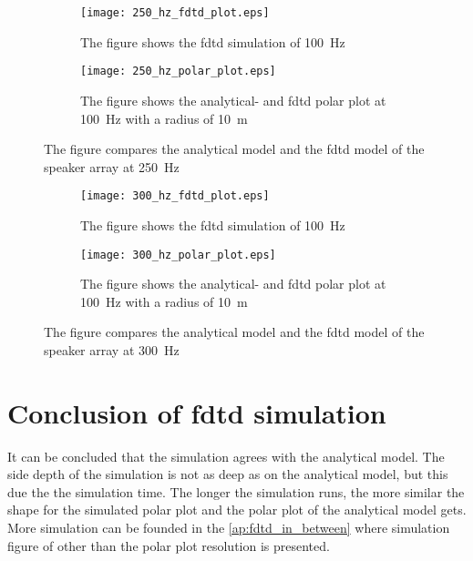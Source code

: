 \begin{figure}[H]
\centering
\begin{subfigure}[htbp]{0.55\textwidth}
		\texttt{[image: 250\_hz\_fdtd\_plot.eps]}
		\caption{The figure shows the \gls{fdtd} simulation of \SI{100}{\hertz}}
		\label{fig:fdtd_250_Hz}
\end{subfigure}
\begin{subfigure}[htbp]{0.35\textwidth}
		\texttt{[image: 250\_hz\_polar\_plot.eps]}
		\caption{The figure shows the analytical- and \gls{fdtd} polar plot at \SI{100}{\hertz} with a radius of \SI{10}{\meter}}
		\label{fig:polar_250_Hz}
\end{subfigure} 
\caption{The figure compares the analytical model and the \gls{fdtd} model of the speaker array at \SI{250}{\hertz}}
\end{figure}


\begin{figure}[H]
\centering
\begin{subfigure}[htbp]{0.55\textwidth}
		\texttt{[image: 300\_hz\_fdtd\_plot.eps]}
		\caption{The figure shows the \gls{fdtd} simulation of \SI{100}{\hertz}}
		\label{fig:fdtd_300_Hz}
\end{subfigure}
\begin{subfigure}[htbp]{0.35\textwidth}
		\texttt{[image: 300\_hz\_polar\_plot.eps]}
		\caption{The figure shows the analytical- and \gls{fdtd} polar plot at \SI{100}{\hertz} with a radius of \SI{10}{\meter}}
		\label{fig:polar_300_Hz}
\end{subfigure} 
\caption{The figure compares the analytical model and the \gls{fdtd} model of the speaker array at \SI{300}{\hertz}}
\end{figure}

\section{Conclusion of \gls{fdtd} simulation}
It can be concluded that the simulation agrees with the analytical model. The side depth of the simulation is not as deep as on the analytical model, but this due the the simulation time. The longer the simulation runs, the more similar the shape for the simulated polar plot and the polar plot of the analytical model gets. More simulation can be founded in the \autoref{ap:fdtd_in_between} where simulation figure of other than the polar plot resolution is presented.


